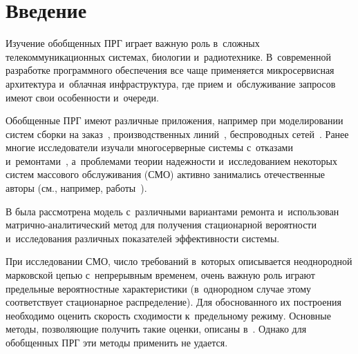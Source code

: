     

  



\thispagestyle{headings}

\begin{multicols}{2}

\label{st\stat}
    
    
    \section{Введение}
    
    Изучение обобщенных ПРГ 
играет важную роль в~слож\-ных телекоммуникационных сис\-те\-мах, био\-ло\-гии 
и~радиотехнике. В~со\-вре\-мен\-ной разработке программного обеспечения все чаще 
применяется мик\-ро\-сер\-вис\-ная архитектура и~облач\-ная инфраструктура, где прием 
и~обслуживание за\-про\-сов имеют свои особенности и~очереди.
    
    Обобщенные ПРГ имеют различные приложения, например при моделировании 
сис\-тем сборки на заказ~\cite{ILS2010}, производственных линий~\cite{FY2002}, 
беспроводных сетей~\cite{KL1999}. Ранее многие исследователи изуча\-ли 
многосерверные сис\-те\-мы с~отказами и~ремонтами~\cite{W1994, JM2004, JG1997, JM2003, KW2012}, 
а~проб\-ле\-ма\-ми тео\-рии на\-деж\-ности 
и~исследованием некоторых сис\-тем массового обслуживания (СМО) ак\-тив\-но занимались 
отечественные авторы (см., например, работы~\cite{VD2017, VSB2020, DN2015}).
{

}
    
    В \cite{WK2014} была рассмотрена модель с~различными вариантами ремонта 
    и~использован мат\-рич\-но-ана\-ли\-ти\-че\-ский метод для получения стационарной ве\-ро\-ят\-ности 
и~исследования раз\-лич\-ных показателей эф\-фек\-тив\-ности сис\-темы.
    

 При исследовании СМО, чис\-ло требований в~которых описывается неоднородной 
марковской цепью с~не\-пре\-рыв\-ным временем, очень важ\-ную роль играют предельные 
вероятностные характеристики (в~однородном случае этому соответствует 
стационарное распределение). Для обосно\-ван\-но\-го их по\-стро\-ения необходимо оценить 
ско\-рость схо\-ди\-мости к~предельному режиму. Основ\-ные методы, поз\-во\-ля\-ющие получить 
такие оценки, описаны в~\cite{ZSKRKS2020}. Однако для обоб\-щен\-ных 
ПРГ эти методы применить не удается.
    

\end{multicols}
